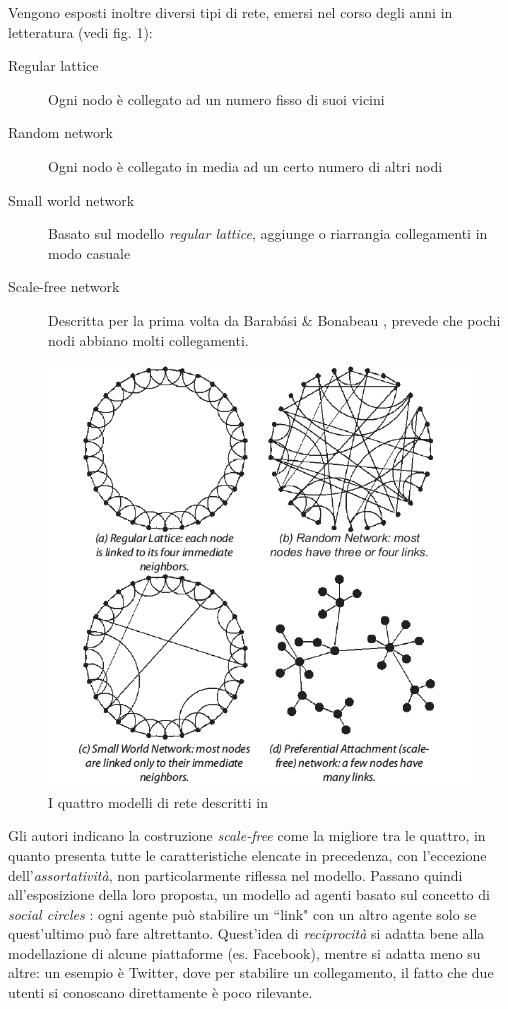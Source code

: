 \documentclass[a4paper,12pt]{article}
\begin{document}
Vengono esposti inoltre diversi tipi di rete, emersi nel corso degli anni in letteratura (vedi fig. 1):
\begin{description}
\item[Regular lattice] Ogni nodo è collegato ad un numero fisso di suoi vicini
\item[Random network] Ogni nodo è collegato in media ad un certo numero di altri nodi
\item[Small world network] Basato sul modello \textit{regular lattice}, aggiunge o riarrangia collegamenti in modo casuale
\item[Scale-free network] Descritta per la prima volta da Barabási \& Bonabeau \cite{scalefree}, prevede che pochi nodi abbiano molti collegamenti.
\end{description}
\begin{figure}[h]
\centering
\includegraphics[scale=0.9]{images/Hamill_Gilbert11.png}
\caption{I quattro modelli di rete descritti in \cite{gilbert}}
\end{figure}
Gli autori indicano la costruzione \textit{scale-free} come la migliore tra le quattro, in quanto presenta tutte le caratteristiche elencate in precedenza, con l'eccezione dell'\textit{assortatività}, non particolarmente riflessa nel modello. Passano quindi all'esposizione della loro proposta, un modello ad agenti basato sul concetto di \textit{social circles} \cite{gilbert}: ogni agente può stabilire un ``link" con un altro agente solo se quest'ultimo può fare altrettanto. Quest'idea di \textit{reciprocità} si adatta bene alla modellazione di alcune piattaforme (es. Facebook), mentre si adatta meno su altre: un esempio è Twitter, dove per stabilire un collegamento, il fatto che due utenti si conoscano direttamente è poco rilevante. 
\end{document}
